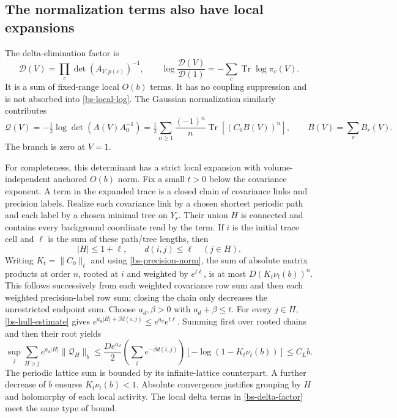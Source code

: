 \subsection{The normalization terms also have local expansions}

The delta-elimination factor is
\begin{equation}\label{bs-delta-factor}
 \mathcal D(V)=\prod_c\det(A_{V,p(c)})^{-1},\qquad
 \log\frac{\mathcal D(V)}{\mathcal D(1)}
         =-\sum_c\operatorname{Tr}\log\pi_c(V).
\end{equation}
It is a sum of fixed-range local $O(b)$ terms. It has no
coupling suppression and is not absorbed into
\eqref{bs-local-log}. The Gaussian normalization similarly
contributes
\begin{equation}\label{bs-gaussian-det}
 \mathcal Q(V)=-\tfrac12\log\det(A(V)A_0^{-1})
 =\tfrac12\sum_{n\ge1}\frac{(-1)^n}{n}
                 \operatorname{Tr}[(C_0 B(V))^n],
 \qquad B(V)=\sum_r B_r(V).
\end{equation}
The branch is zero at $V=1$.

For completeness, this determinant has a strict local
expansion with volume-independent anchored $O(b)$ norm.
Fix a small $t>0$ below the covariance exponent. A term
in the expanded trace is a closed chain of covariance
links and precision labels. Realize each covariance link
by a chosen shortest periodic path and each label by a
chosen minimal tree on $Y_r$. Their union $H$ is connected
and contains every background coordinate read by the term.
If $i$ is the initial trace cell and $\ell$ is the sum of
these path/tree lengths, then
\begin{equation}\label{bs-hull-estimate}
 |H|\le1+\ell,\qquad d(i,j)\le\ell\quad(j\in H).
\end{equation}
Writing $K_t=\|C_0\|_t$ and using
\eqref{bs-precision-norm}, the sum of absolute matrix
products at order $n$, rooted at $i$ and weighted by
$e^{t\ell}$, is at most $D(K_t\nu_t(b))^n$.
This follows successively from each weighted covariance
row sum and then each weighted precision-label row sum;
closing the chain only decreases the unrestricted endpoint
sum. Choose $a_d,\beta>0$ with $a_d+\beta\le t$.
For every $j\in H$, \eqref{bs-hull-estimate} gives
$e^{a_d|H|+\beta d(i,j)}\le e^{a_d}e^{t\ell}$.
Summing first over rooted chains and then their root yields
\begin{equation}\label{bs-det-bound}
 \sup_j\sum_{H\ni j}e^{a_d|H|}\|\mathcal Q_H\|_b
 \le\frac{De^{a_d}}2
       \left(\sum_i e^{-\beta d(i,j)}\right)
       [-\log(1-K_t\nu_t(b))]\le C_L b.
\end{equation}
The periodic lattice sum is bounded by its infinite-lattice
counterpart. A further decrease of $b$ ensures
$K_t\nu_t(b)<1$. Absolute convergence justifies grouping by
$H$ and holomorphy of each local activity. The local delta
terms in \eqref{bs-delta-factor} meet the same type of bound.

